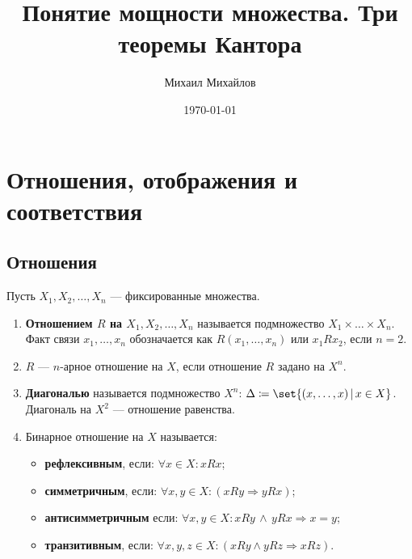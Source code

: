 \documentclass{article}
\title{Понятие мощности множества. Три теоремы Кантора}
\author{Михаил Михайлов}
\date{\today}
\begin{document}
\maketitle
\tableofcontents

\section{Отношения, отображения и соответствия}

\subsection{Отношения}
\begin{definition}
    \label{def:relation}
    Пусть \(X_1, X_2, \ldots, X_n\) --- фиксированные множества.
    
    \begin{enumerate}
        \item \textbf{Отношением \(R\) на \(X_1, X_2, \ldots, X_n\)} называется подмножество \(X_1 \times \ldots \times X_n\). Факт связи \(x_1, \ldots, x_n\) обозначается как \(R(x_1, \ldots, x_n)\) или \(x_1 R x_2\), если \(n = 2\).
        \item \(R\) --- \(n\)-арное отношение на \(X\), если отношение \(R\) задано на \(X^n\).
        \item \textbf{Диагональю} называется подмножество \(X^n\): \(\Delta \coloneq \set{(x,\ldots, x)\,|\, x \in X}\). Диагональ на \(X^2\) --- отношение равенства.
        \item Бинарное отношение на \(X\) называется:
            \begin{itemize}
                \item \textbf{рефлексивным}, если: \(\forall x \in X: x R x \);
                \item \textbf{симметричным}, если: \(\forall x, y \in X: (x R y \Rightarrow y R x)\);
                \item \textbf{антисимметричным} если: \(\forall x, y \in X: x R y \,\land\, y R x \Rightarrow x = y\);
                \item \textbf{транзитивным}, если: \(\forall x, y, z \in X: (x R y \land y R z \Rightarrow x R z)\).
            \end{itemize}
    \end{enumerate}
\end{definition}
    
\end{document}
